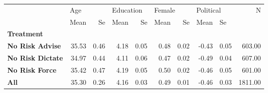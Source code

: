 \begin{tabular}{lrrrrrrrrr}
\toprule
{} & \multicolumn{2}{l}{Age} & \multicolumn{2}{l}{Education} & \multicolumn{2}{l}{Female} & \multicolumn{2}{l}{Political} &       N \\
{} &  Mean &   Se &      Mean &   Se &   Mean &   Se &      Mean & \multicolumn{2}{l}{Se} \\
\textbf{Treatment      } &       &      &           &      &        &      &           &      &         \\
\midrule
\textbf{No Risk Advise } & 35.53 & 0.46 &      4.18 & 0.05 &   0.48 & 0.02 &     -0.43 & 0.05 &  603.00 \\
\textbf{No Risk Dictate} & 34.97 & 0.44 &      4.11 & 0.06 &   0.47 & 0.02 &     -0.49 & 0.04 &  607.00 \\
\textbf{No Risk Force  } & 35.42 & 0.47 &      4.19 & 0.05 &   0.50 & 0.02 &     -0.46 & 0.05 &  601.00 \\
\textbf{All            } & 35.30 & 0.26 &      4.16 & 0.03 &   0.49 & 0.01 &     -0.46 & 0.03 & 1811.00 \\
\bottomrule
\end{tabular}
